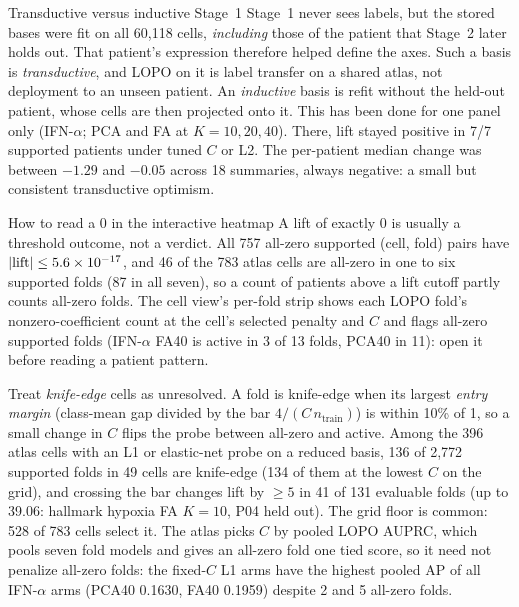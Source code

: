 \begin{explainbox}{Transductive versus inductive Stage~1}
Stage~1 never sees labels, but the stored bases were fit on all 60,118 cells, \emph{including} those of the patient that Stage~2 later holds out. That patient's expression therefore helped define the axes. Such a basis is \emph{transductive}, and LOPO on it is label transfer on a shared atlas, not deployment to an unseen patient. An \emph{inductive} basis is refit without the held-out patient, whose cells are then projected onto it. This has been done for one panel only (IFN-$\alpha$; PCA and FA at $K=10,20,40$). There, lift stayed positive in 7/7 supported patients under tuned $C$ or L2. The per-patient median change was between $-1.29$ and $-0.05$\pp{} across 18 summaries, always negative: a small but consistent transductive optimism.
\end{explainbox}

\begin{explainbox}{How to read a 0 in the interactive heatmap}
A lift of exactly 0 is usually a threshold outcome, not a verdict. All 757 all-zero supported (cell, fold) pairs have $|\mathrm{lift}| \leq 5.6\times10^{-17}$, and 46 of the 783 atlas cells are all-zero in one to six supported folds (87 in all seven), so a count of patients above a lift cutoff partly counts all-zero folds. The cell view's per-fold strip shows each LOPO fold's nonzero-coefficient count at the cell's selected penalty and $C$ and flags all-zero supported folds (IFN-$\alpha$ FA40 is active in 3 of 13 folds, PCA40 in 11): open it before reading a patient pattern.

Treat \emph{knife-edge} cells as unresolved. A fold is knife-edge when its largest \emph{entry margin} (class-mean gap divided by the bar $4/(C\,n_{\text{train}})$) is within 10\% of 1, so a small change in $C$ flips the probe between all-zero and active. Among the 396 atlas cells with an L1 or elastic-net probe on a reduced basis, 136 of 2,772 supported folds in 49 cells are knife-edge (134 of them at the lowest $C$ on the grid), and crossing the bar changes lift by $\geq 5$\pp{} in 41 of 131 evaluable folds (up to 39.06\pp: hallmark hypoxia FA $K = 10$, P04 held out). The grid floor is common: 528 of 783 cells select it. The atlas picks $C$ by pooled LOPO AUPRC, which pools seven fold models and gives an all-zero fold one tied score, so it need not penalize all-zero folds: the fixed-$C$ L1 arms have the highest pooled AP of all IFN-$\alpha$ arms (PCA40 0.1630, FA40 0.1959) despite 2 and 5 all-zero folds. 
\end{explainbox}


